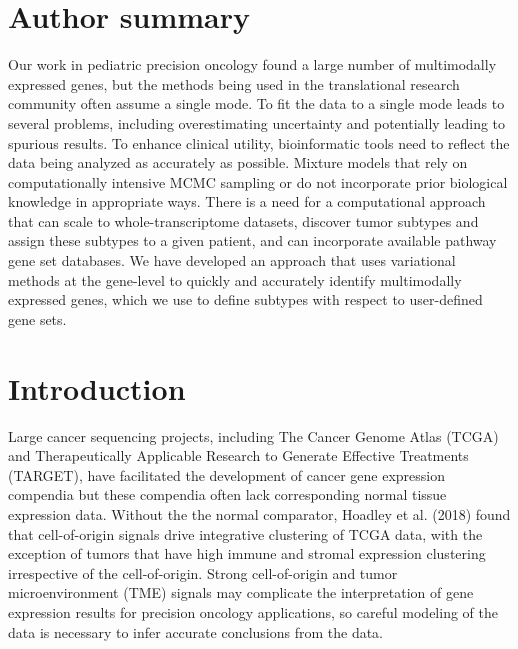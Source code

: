 \documentclass[10pt,letterpaper]{article}
\begin{document}
\section*{Author summary}
Our work in pediatric precision oncology found a large number of multimodally expressed genes, but the methods being used in the translational research community often assume a single mode. To fit the data to a single mode leads to several problems, including overestimating uncertainty and potentially leading to spurious results. To enhance clinical utility, bioinformatic tools need to reflect the data being analyzed as accurately as possible. Mixture models that rely on computationally intensive MCMC sampling or do not incorporate prior biological knowledge in appropriate ways. There is a need for a computational approach that can scale to whole-transcriptome datasets, discover tumor subtypes and assign these subtypes to a given patient, and can incorporate available pathway gene set databases. We have developed an approach that uses variational methods at the gene-level to quickly and accurately identify multimodally expressed genes, which we use to define subtypes with respect to user-defined gene sets.


\linenumbers

\section*{Introduction}
Large cancer sequencing projects, including The Cancer Genome Atlas (TCGA) and Therapeutically Applicable Research to Generate Effective Treatments (TARGET), have facilitated the development of cancer gene expression compendia \cite{vivianToilEnablesReproducible2017, pughGeneticLandscapeHighrisk2013, goldmanUCSCXenaPlatform2018, thecancergenomeatlasresearchnetworkCancerGenomeAtlas2013, newtonTumorMapExploringMolecular2017} but these compendia often lack corresponding normal tissue expression data. Without the the normal comparator, Hoadley et al. (2018) found that cell-of-origin signals drive integrative clustering of TCGA data, with the exception of tumors that have high immune and stromal expression clustering irrespective of the cell-of-origin. Strong cell-of-origin and tumor microenvironment (TME) signals may complicate the interpretation of gene expression results for precision oncology applications, so careful modeling of the data is necessary to infer accurate conclusions from the data. 
\end{document}
